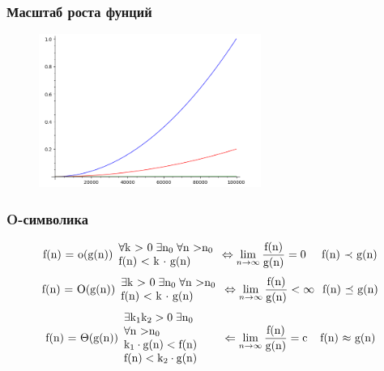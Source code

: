 \documentclass[russian, 12pt]{beamer}
\begin{document}
\begin{frame}
\frametitle{Масштаб роста фунций}
\begin{figure}
  \includegraphics[width=\linewidth, height=5cm]{img/complexity_6.png}
\end{figure}
\end{frame}
\begin{frame}
\frametitle{O-символика}
\begin{equation*}
\text{f(n) = o(g(n))}
  \begin{array}{l}
  \forall\text{k > 0}\;\exists\text{n}_0\;  \forall \text{n >}\text{n}_0  \\
  \text{f(n) < k $\cdot$ g(n)}
  \end{array}
\Leftrightarrow
\lim_{n\rightarrow\infty}\frac{\text{f(n)}}{\text{g(n)}}=\text{0}
\hspace{0.49cm}
\text{f(n) $\prec$ g(n)}
\end{equation*}
\vspace{0.3cm}
\begin{equation*}
\text{f(n) = O(g(n))}
  \begin{array}{l}
    \exists\text{k > 0}\;\exists\text{n}_0\;  \forall \text{n >}\text{n}_0  \\
    \text{f(n) < k $\cdot$ g(n)}
  \end{array}
\Leftrightarrow
\lim_{n\rightarrow\infty}\frac{\text{f(n)}}{\text{g(n)}}<\infty
\hspace{0.25cm}
\text{f(n) $\preceq$ g(n)}
\end{equation*}
\vspace{0.3cm}
\begin{equation*}
\text{f(n) = $\Theta$(g(n))}
  \begin{array}{l}
    \exists\text{k}_1\text{k}_2 >\text{0}\;\exists\text{n}_0\hspace{0.5cm}\\
    \forall \text{n >}\text{n}_0\\
    \text{k}_1 \cdot \text{g(n)} < \text{f(n)}\\
    \text{f(n)} < \text{k}_2 \cdot \text{g(n)}
  \end{array}
\hspace{0.2cm}
\Leftarrow
\lim_{n\rightarrow\infty}\frac{\text{f(n)}}{\text{g(n)}}=\text{c}
\hspace{0.4cm}
\text{f(n) $\approx$ g(n)}
\end{equation*}
\end{frame}
\end{document}
